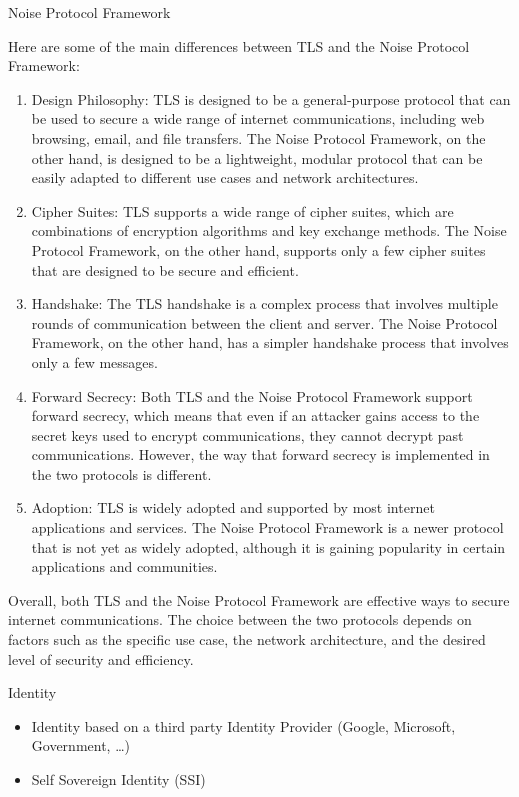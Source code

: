 \begin{block}{Noise Protocol Framework}
\begin{description}
Here are some of the main differences between TLS and the Noise Protocol
Framework:

\begin{enumerate}
\tightlist
\item
  Design Philosophy: TLS is designed to be a general-purpose protocol
  that can be used to secure a wide range of internet communications,
  including web browsing, email, and file transfers. The Noise Protocol
  Framework, on the other hand, is designed to be a lightweight, modular
  protocol that can be easily adapted to different use cases and network
  architectures.
\item
  Cipher Suites: TLS supports a wide range of cipher suites, which are
  combinations of encryption algorithms and key exchange methods. The
  Noise Protocol Framework, on the other hand, supports only a few
  cipher suites that are designed to be secure and efficient.
\item
  Handshake: The TLS handshake is a complex process that involves
  multiple rounds of communication between the client and server. The
  Noise Protocol Framework, on the other hand, has a simpler handshake
  process that involves only a few messages.
\item
  Forward Secrecy: Both TLS and the Noise Protocol Framework support
  forward secrecy, which means that even if an attacker gains access to
  the secret keys used to encrypt communications, they cannot decrypt
  past communications. However, the way that forward secrecy is
  implemented in the two protocols is different.
\item
  Adoption: TLS is widely adopted and supported by most internet
  applications and services. The Noise Protocol Framework is a newer
  protocol that is not yet as widely adopted, although it is gaining
  popularity in certain applications and communities.
\end{enumerate}

Overall, both TLS and the Noise Protocol Framework are effective ways to
secure internet communications. The choice between the two protocols
depends on factors such as the specific use case, the network
architecture, and the desired level of security and efficiency.
\end{description}
\end{block}

\hypertarget{notes__02025-identity.md}{}
\begin{block}{Identity}
\protect\hypertarget{notes__02025-identity.md__identity}{}
\begin{itemize}
\tightlist
\item
  Identity based on a third party Identity Provider (Google, Microsoft,
  Government, \ldots)
\item
  Self Sovereign Identity (SSI)
\end{itemize}
\end{block}

